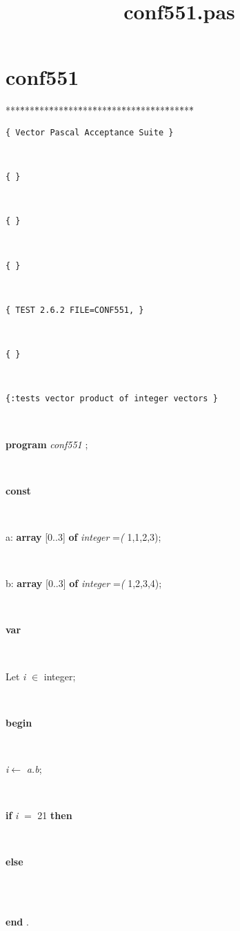 \documentclass[10pt, a4paper]{article}
\title{conf551.pas}
\begin{document}
\maketitle

\tableofcontents
\section{conf551}
\begin{tabbing}
***\=***\=***\=***\=***\=***\=***\=***\=***\=***\=***\=***\=***\=\kill
\parbox{14cm}{\texttt{\small{\{                Vector Pascal Acceptance Suite                      \}}}}\\
\parbox{14cm}{\texttt{\small{\{                                                                    \}}}}\\
\parbox{14cm}{\texttt{\small{\{                                                                    \}}}}\\
\parbox{14cm}{\texttt{\small{\{                                                                    \}}}}\\
\parbox{14cm}{\texttt{\small{\{ TEST 2.6.2 FILE=CONF551,                                           \}}}}\\
\parbox{14cm}{\texttt{\small{\{                                                                    \}}}}\\
\parbox{14cm}{\texttt{\small{\{:tests vector product of  integer vectors                           \}}}}\\
\parbox{14cm}{\textsf{\textbf{program}  \textit{conf551} ;}}\\
\+\parbox{14cm}{\textsf{\textbf{const} }}\\
\parbox{14cm}{a: \textbf{ array } \textsf{[0..3] } \textbf{ of } \textsf{ \textit{integer} =\textit{(} 1,1,2,3);}}\\
\parbox{14cm}{b: \textbf{ array } \textsf{[0..3] } \textbf{ of } \textsf{ \textit{integer} =\textit{(} 1,2,3,4);}}\\
\<\parbox{14cm}{\textsf{\textbf{var} }}\\
\parbox{14cm}{\textsf{Let \textit{i} $\in$ integer;}}\\
\-\<\+\parbox{14cm}{\textsf{\textbf{begin} }}\\
\parbox{14cm}{\textsf{\textit{i}$\leftarrow$ \textit{a.b}}; }\\
\+\parbox{14cm}{\textsf {\textbf {if } \textsf{\textit{i} $=$ 21} \textbf{ then } }}\\
\<\parbox{14cm}{\textsf{\textbf{else} }}\\
\\
\<\-\<\-\parbox{14cm}{\textsf{\textbf{end} .}}\\
\end{tabbing}
\end{document}
